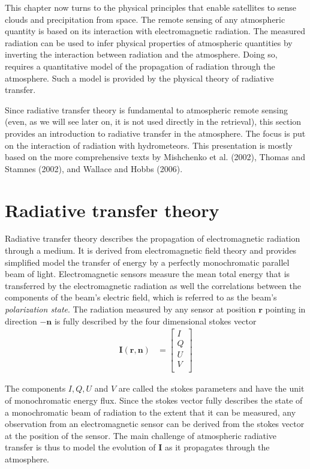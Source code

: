 
This chapter now turns to the physical principles that enable satellites to
sense clouds and precipitation from space. The remote sensing of any atmospheric
quantity is based on its interaction with electromagnetic radiation. The
measured radiation can be used to infer physical properties of atmospheric
quantities by inverting the interaction between radiation and the atmosphere.
Doing so, requires a quantitative model of the propagation of radiation through
the atmosphere. Such a model is provided by the physical theory of radiative
transfer.

Since radiative transfer theory is fundamental to atmospheric remote sensing
(even, as we will see later on, it is not used directly
in the retrieval), this section provides an introduction to radiative transfer
in the atmosphere. The focus is put on the interaction of radiation with
hydrometeors. This presentation is mostly based on the more comprehensive texts
by Mishchenko et al. (2002), Thomas and Stamnes (2002), and Wallace and Hobbs
(2006).


\section{Radiative transfer theory}

Radiative transfer theory describes the propagation of electromagnetic radiation
through a medium. It is derived from electromagnetic field theory and provides
simplified model the transfer of energy by a perfectly monochromatic parallel
beam of light. Electromagnetic sensors measure the mean total energy that is
transferred by the electromagnetic radiation as well the correlations between
the components of the beam's electric field, which is referred to as the beam's
\textit{polarization state}. The radiation measured by any sensor at position $\bm{r}$ pointing in direction $\bm{-n}$ is fully described by the four dimensional stokes vector
\begin{align}
  \bm{I}(\bm{r}, \bm{n}) &= \left [ \begin{array}{c}
    I \\
    Q \\
    U \\
    V \\
    \end{array} \right ]
\end{align}

The components $I, Q, U$ and $V$ are called the stokes parameters and have the
unit of monochromatic energy flux. Since the stokes vector fully describes the
state of a monochromatic beam of radiation to the extent that it can be
measured, any observation from an electromagnetic sensor can be derived from the
stokes vector at the position of the sensor. The main challenge of atmospheric
radiative transfer is thus to model the evolution of $\bm{I}$ as it propagates
through the atmosphere.


